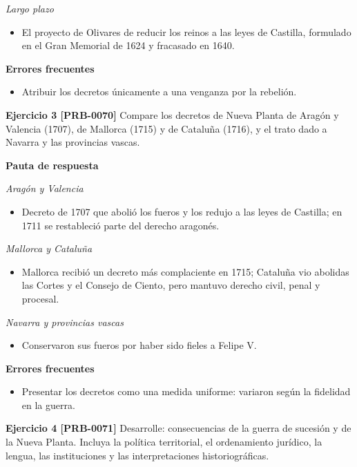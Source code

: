 \documentclass{book}
\begin{document}
\noindent\textit{Largo plazo}
\begin{itemize}
\item El proyecto de Olivares de reducir los reinos a las leyes de Castilla, formulado en el Gran Memorial de 1624 y fracasado en 1640.
\end{itemize}

\noindent\textbf{Errores frecuentes}
\begin{itemize}
\item Atribuir los decretos únicamente a una venganza por la rebelión.
\end{itemize}

\noindent\textbf{Ejercicio 3 [PRB-0070]}
Compare los decretos de Nueva Planta de Aragón y Valencia (1707), de Mallorca (1715) y de Cataluña (1716), y el trato dado a Navarra y las provincias vascas.


\noindent\textbf{Pauta de respuesta}

\noindent\textit{Aragón y Valencia}
\begin{itemize}
\item Decreto de 1707 que abolió los fueros y los redujo a las leyes de Castilla; en 1711 se restableció parte del derecho aragonés.
\end{itemize}

\noindent\textit{Mallorca y Cataluña}
\begin{itemize}
\item Mallorca recibió un decreto más complaciente en 1715; Cataluña vio abolidas las Cortes y el Consejo de Ciento, pero mantuvo derecho civil, penal y procesal.
\end{itemize}

\noindent\textit{Navarra y provincias vascas}
\begin{itemize}
\item Conservaron sus fueros por haber sido fieles a Felipe V.
\end{itemize}

\noindent\textbf{Errores frecuentes}
\begin{itemize}
\item Presentar los decretos como una medida uniforme: variaron según la fidelidad en la guerra.
\end{itemize}

\noindent\textbf{Ejercicio 4 [PRB-0071]}
Desarrolle: consecuencias de la guerra de sucesión y de la Nueva Planta. Incluya la política territorial, el ordenamiento jurídico, la lengua, las instituciones y las interpretaciones historiográficas.
\end{document}
